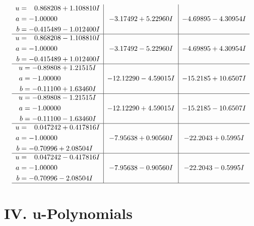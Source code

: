 \documentclass[1p]{elsarticle_modified}
\theoremstyle{definition}
\begin{document}
$$\begin{array}{c|c|c}
\begin{aligned}
u &= \phantom{-}0.868208 + 1.108810 I \\
a &= -1.00000\phantom{ +0.000000I} \\
b &= -0.415489 - 1.012400 I\end{aligned}
 & -3.17492 + 5.22960 I & -4.69895 - 4.30954 I \\ \hline\begin{aligned}
u &= \phantom{-}0.868208 - 1.108810 I \\
a &= -1.00000\phantom{ +0.000000I} \\
b &= -0.415489 + 1.012400 I\end{aligned}
 & -3.17492 - 5.22960 I & -4.69895 + 4.30954 I \\ \hline\begin{aligned}
u &= -0.89808 + 1.21515 I \\
a &= -1.00000\phantom{ +0.000000I} \\
b &= -0.11100 + 1.63460 I\end{aligned}
 & -12.12290 - 4.59015 I & -15.2185 + 10.6507 I \\ \hline\begin{aligned}
u &= -0.89808 - 1.21515 I \\
a &= -1.00000\phantom{ +0.000000I} \\
b &= -0.11100 - 1.63460 I\end{aligned}
 & -12.12290 + 4.59015 I & -15.2185 - 10.6507 I \\ \hline\begin{aligned}
u &= \phantom{-}0.047242 + 0.417816 I \\
a &= -1.00000\phantom{ +0.000000I} \\
b &= -0.70996 + 2.08504 I\end{aligned}
 & -7.95638 + 0.90560 I & -22.2043 + 0.5995 I \\ \hline\begin{aligned}
u &= \phantom{-}0.047242 - 0.417816 I \\
a &= -1.00000\phantom{ +0.000000I} \\
b &= -0.70996 - 2.08504 I\end{aligned}
 & -7.95638 - 0.90560 I & -22.2043 - 0.5995 I\\
 \hline 
 \end{array}$$\newpage
\newpage\renewcommand{\arraystretch}{1}
\centering \section*{ IV. u-Polynomials}
\end{document}
